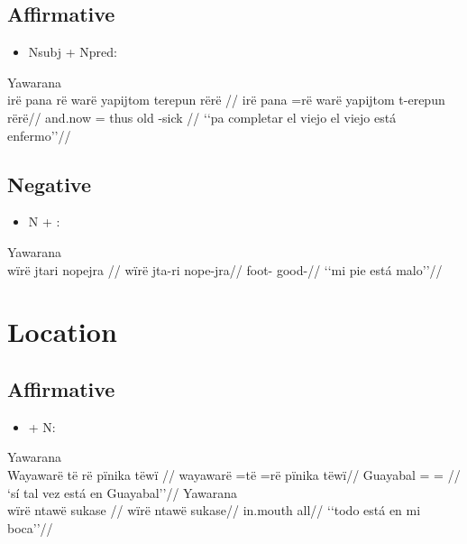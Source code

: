 \documentclass{memoir}
\begin{document}
\subsection{Affirmative}

\begin{itemize}
\tightlist
\item
  Nsubj + Npred:
\end{itemize}

\ex Yawarana \\
\label{desccasmaj-85}    \begingl
    \glpreamble irë pana rë warë yapijtom terepun rërë //
    \gla irë pana =rë warë yapijtom t-erepun rërë//
    \glb and.now = thus old -sick //
        \glft ‘‘pa completar el viejo el viejo está enfermo’’//  
    \endgl 
\xe

\subsection{Negative}

\begin{itemize}
\tightlist
\item
  N + :
\end{itemize}

\ex Yawarana \\
\label{histaccigrme-2}    \begingl
    \glpreamble wïrë jtari nopejra //
    \gla wïrë jta-ri nope-jra//
    \glb {} foot- good-//
        \glft ‘‘mi pie está malo’’//  
    \endgl 
\xe

\section{Location}

\subsection{Affirmative}

\begin{itemize}
\tightlist
\item
   + N:
\end{itemize}

\pex\label{}    \a Yawarana\\
    \label{convamgu-80}        \begingl
        \glpreamble Wayawarë të rë pïnika tëwï //
        \gla wayawarë =të =rë pïnika tëwï//
        \glb Guayabal = =  //
            \glft ‘sí tal vez está en Guayabal’’//  
        \endgl 
    \a Yawarana\\
    \label{histyarirdi-339}        \begingl
        \glpreamble wïrë ntawë sukase //
        \gla wïrë ntawë sukase//
        \glb {} in.mouth all//
            \glft ‘‘todo está en mi boca’’//  
        \endgl 
\xe
\end{document}
